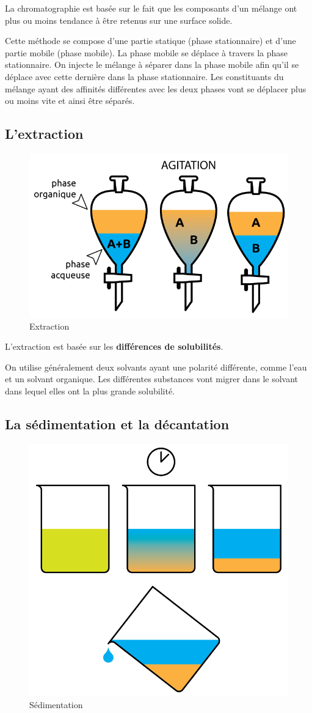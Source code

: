\documentclass[
  11pt,
  a4paper,
  openany]{book}
\begin{document}
La chromatographie est basée sur le fait que les composants d'un mélange ont plus ou moins tendance à être retenus sur une surface solide.

Cette méthode se compose d'une partie statique (phase stationnaire) et d'une partie mobile (phase mobile). La phase mobile se déplace à travers la phase stationnaire. On injecte le mélange à séparer dans la phase mobile afin qu'il se déplace avec cette dernière dans la phase stationnaire. Les constituants du mélange ayant des affinités différentes avec les deux phases vont se déplacer plus ou moins vite et ainsi être séparés.

\subsection{L'extraction}\label{lextraction}

\begin{figure}

{\centering \includegraphics[width=0.45\linewidth]{images/extraction} 

}

\caption{Extraction}\label{fig:extraction}
\end{figure}

L'extraction est basée sur les \textbf{différences de solubilités}.

On utilise généralement deux solvants ayant une polarité différente, comme l'eau et un solvant organique. Les différentes substances vont migrer dans le solvant dans lequel elles ont la plus grande solubilité.

\newpage

\subsection{La sédimentation et la décantation}\label{la-suxe9dimentation-et-la-duxe9cantation}

\begin{figure}

{\centering \includegraphics[width=0.33\linewidth]{images/sedimentation} 

}

\caption{Sédimentation}\label{fig:sedimentation}
\end{figure}
\end{document}
